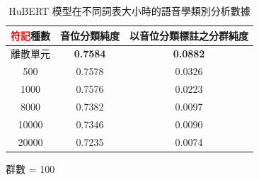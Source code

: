{\begin{table}[!htbp]
            \begin{subtable}[t]{\textwidth}
                \centering
                \begin{tabular}{|c|c|c|} \hline
                    \textcolor{red}{符記}種數  & 音位分類純度    & 以音位分類標註之分群純度 \\ \hline
                                     離散單元  & \textbf{0.7584} & \textbf{0.0882}          \\ \hline
                                          500  &        0.7578   &         0.0326           \\ \hline
                                         1000  &        0.7576   &         0.0223           \\ \hline
                                         8000  &        0.7382   &         0.0097           \\ \hline
                                        10000  &        0.7346   &         0.0090           \\ \hline
                                        20000  &        0.7235   &         0.0074           \\ \hline
                \end{tabular}
                \caption{群數 = 100}
                \label{subtab:ch4-new-hubert-pcls-clu100}
            \end{subtable}

            \caption{HuBERT 模型在不同詞表大小時的語音學類別分析數據}
            \label{tab:new--hubert-pcls-results}
        \end{table}
    }


